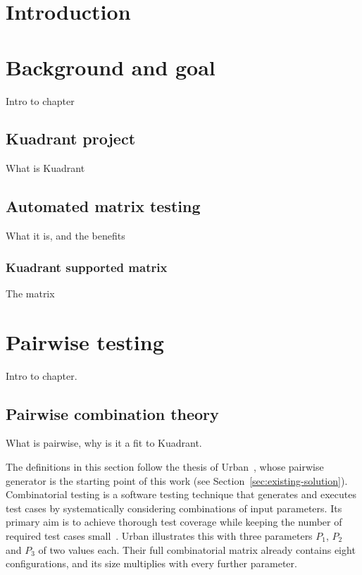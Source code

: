 \documentclass[
  digital, %
  oneside, %
  lof,     %
  nolot,     %
]{fithesis4}
\begin{document}
\clearpage
\printnoidxglossary[title={Abbreviations}, type=\acronymtype]

\chapter*{Introduction}

\chapter{Background and goal}
\label{ch:first}
Intro to chapter
\section{Kuadrant project}
What is Kuadrant
\section{Automated matrix testing}
What it is, and the benefits
\subsection{Kuadrant supported matrix}
The matrix

\chapter{Pairwise testing}
Intro to chapter.
\section{Pairwise combination theory}
\label{sec:pairwise-theory}
What is pairwise, why is it a fit to Kuadrant.

The definitions in this section follow the thesis of Urban~\cite{Urban2024thesis},
whose pairwise generator is the starting point of this work (see
Section~\ref{sec:existing-solution}). Combinatorial testing is a software
testing technique that generates and executes test cases by systematically
considering combinations of input parameters. Its primary aim is to achieve
thorough test coverage while keeping the number of required test cases
small~\cite[p.~11]{Urban2024thesis}. Urban illustrates this with three
parameters $P_1$, $P_2$ and $P_3$ of two values each. Their full combinatorial
matrix already contains eight configurations, and its size multiplies with every
further parameter.
\end{document}
